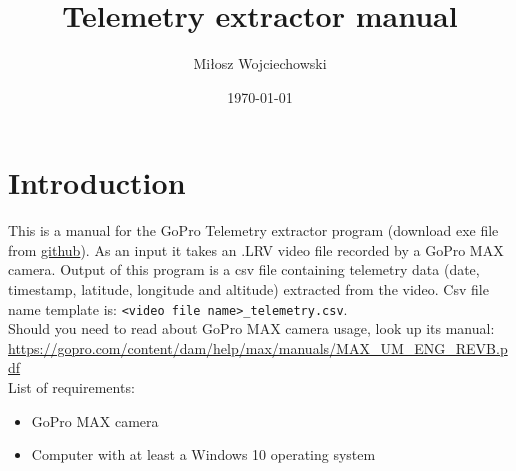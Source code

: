 \documentclass[a4paper,12pt]{book}
\begin{document}
\author{Miłosz Wojciechowski}
\title{Telemetry extractor manual}
\date{\today}


\maketitle
\pagebreak
{}
\renewcommand{\labelenumii}{\arabic{enumi}.\arabic{enumii}}
\tableofcontents
\chapter{Introduction}
This is a manual for the GoPro Telemetry extractor program (download exe file from \href{https://github.com/miloszwojciechowski/Warsaw-model/releases}{github}). As an input it takes an .LRV video file recorded by a GoPro MAX camera. Output of this program is a csv file containing telemetry data (date, timestamp, latitude, longitude and altitude) extracted from the video. Csv file name template is: \verb|<video file name>_telemetry.csv|. \\



Should you need to read about GoPro MAX camera usage, look up its manual: \url{https://gopro.com/content/dam/help/max/manuals/MAX_UM_ENG_REVB.pdf} \\
List of requirements:
\begin{itemize}
	\item GoPro MAX camera
	\item Computer with at least a Windows 10 operating system
\end{itemize}
\end{document}
